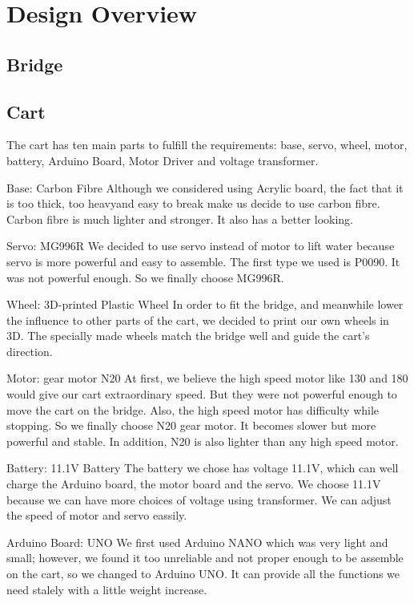 \section{Design Overview}
\subsection{Bridge}
\subsection{Cart}
The cart has ten main parts to fulfill the requirements: base, servo, wheel,
motor, battery, Arduino Board, Motor Driver and voltage transformer.

Base: Carbon Fibre  
Although we considered using Acrylic board, the fact that it is too thick, too
heavyand easy to break make us decide to use carbon fibre.
Carbon fibre is much lighter and stronger.
It also has a better looking. 

Servo: MG996R 
We decided to use servo instead of motor to lift water because servo is more
powerful and easy to assemble. 
The first type we used is P0090.
It was not powerful enough.
So we finally choose MG996R. 

Wheel: 3D-printed Plastic Wheel 
In order to fit the bridge, and meanwhile lower the influence to other parts of
the cart, we decided to print our own wheels in 3D.
The specially made wheels match the bridge well and guide the cart’s direction.

Motor:  gear motor N20 
At first, we believe the high speed motor like 130 and 180 would give our cart
extraordinary speed.
But they were not powerful enough to move the cart on the bridge.
Also, the high speed motor has difficulty while stopping.
So we finally choose N20 gear motor.
It becomes slower but more powerful and stable.
In addition, N20 is also lighter than any high speed motor.  

Battery: 11.1V Battery 
The battery we chose has voltage 11.1V, which can well charge the Arduino board,
the motor board and the servo.
We choose 11.1V because we can have more choices of voltage using transformer.
We can adjust the speed of motor and servo eassily.  

Arduino Board: UNO 
We first used Arduino NANO which was very light and small; however, we found it
too unreliable and not proper enough to be assemble on the cart, so we changed
to Arduino UNO.
It can provide all the functions we need stalely with a little weight increase.

